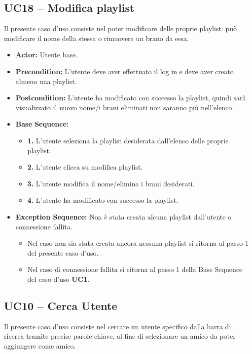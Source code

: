 \subsection{UC18 -- Modifica playlist}
Il presente caso d'uso consiste nel poter modificare delle proprie playlist: può modificare il nome della stessa o rimuovere un brano da essa.
\begin{itemize}
    \item \textbf{Actor:} Utente base.
    \item \textbf{Precondition:} L'utente deve aver effettuato il log in e deve aver creato almeno una playlist.
    \item \textbf{Postcondition:} L'utente ha modificato con successo la playlist, quindi sarà visualizzato il nuovo nome/i brani eliminati non saranno più nell'elenco.
    \item \textbf{Base Sequence:}
    \begin{itemize}
        \item \textbf{1.} L'utente seleziona la playlist desiderata dall'elenco delle proprie playlist.
        \item \textbf{2.} L'utente clicca su modifica playlist.
        \item \textbf{3.} L'utente modifica il nome/elimina i brani desiderati.
        \item \textbf{4.} L'utente ha modificato con successo la playlist.
    \end{itemize}
    \item \textbf{Exception Sequence:} Non è stata creata alcuna playlist dall'utente o connessione fallita.
    \begin{itemize}
        \item Nel caso non sia stata creata ancora nessuna playlist si ritorna al passo 1 del presente caso d'uso.
        \item Nel caso di connessione fallita si ritorna al passo 1 della Base Sequence del caso d'uso \textbf{UC1}.
    \end{itemize}
\end{itemize}
\vspace{1cm}

\subsection{UC10 -- Cerca Utente}
Il presente caso d'uso consiste nel cercare un utente specifico dalla barra 
di ricerca tramite precise parole chiave, al fine di selezionare un amico
da poter aggiungere come amico.

